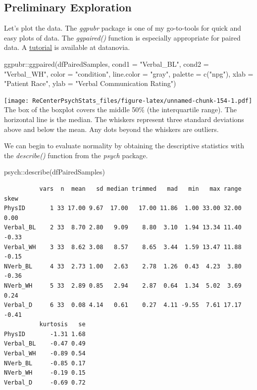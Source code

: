 \documentclass[
  11pt,
]{book}
\newenvironment{Shaded}{\begin{snugshade}}{\end{snugshade}}
\newcommand{\AttributeTok}[1]{\textcolor[rgb]{0.77,0.63,0.00}{#1}}
\newcommand{\FunctionTok}[1]{\textcolor[rgb]{0.00,0.00,0.00}{#1}}
\newcommand{\NormalTok}[1]{#1}
\newcommand{\SpecialCharTok}[1]{\textcolor[rgb]{0.00,0.00,0.00}{#1}}
\newcommand{\StringTok}[1]{\textcolor[rgb]{0.31,0.60,0.02}{#1}}
\begin{document}
\hypertarget{preliminary-exploration-2}{%
\subsection{Preliminary Exploration}\label{preliminary-exploration-2}}

Let's plot the data. The \emph{ggpubr} package is one of my go-to-tools for quick and easy plots of data. The \emph{ggpaired()} function is especially appropriate for paired data. A \href{https://rpkgs.datanovia.com/ggpubr/reference/ggpaired.html}{tutorial} is available at datanovia.

\begin{Shaded}
\begin{Highlighting}[]
\NormalTok{ggpubr}\SpecialCharTok{::}\FunctionTok{ggpaired}\NormalTok{(dfPairedSamples, }\AttributeTok{cond1 =} \StringTok{"Verbal\_BL"}\NormalTok{, }\AttributeTok{cond2 =} \StringTok{"Verbal\_WH"}\NormalTok{,}
    \AttributeTok{color =} \StringTok{"condition"}\NormalTok{, }\AttributeTok{line.color =} \StringTok{"gray"}\NormalTok{, }\AttributeTok{palette =} \FunctionTok{c}\NormalTok{(}\StringTok{"npg"}\NormalTok{), }\AttributeTok{xlab =} \StringTok{"Patient Race"}\NormalTok{,}
    \AttributeTok{ylab =} \StringTok{"Verbal Communication Rating"}\NormalTok{)}
\end{Highlighting}
\end{Shaded}

\texttt{[image: ReCenterPsychStats\_files/figure-latex/unnamed-chunk-154-1.pdf]}
The box of the boxplot covers the middle 50\% (the interquartile range). The horizontal line is the median. The whiskers represent three standard deviations above and below the mean. Any dots beyond the whiskers are outliers.

We can begin to evaluate normality by obtaining the descriptive statistics with the \emph{describe()} function from the \emph{psych} package.

\begin{Shaded}
\begin{Highlighting}[]
\NormalTok{psych}\SpecialCharTok{::}\FunctionTok{describe}\NormalTok{(dfPairedSamples)}
\end{Highlighting}
\end{Shaded}

\begin{verbatim}
          vars  n  mean   sd median trimmed   mad   min   max range  skew
PhysID       1 33 17.00 9.67  17.00   17.00 11.86  1.00 33.00 32.00  0.00
Verbal_BL    2 33  8.70 2.80   9.09    8.80  3.10  1.94 13.34 11.40 -0.33
Verbal_WH    3 33  8.62 3.08   8.57    8.65  3.44  1.59 13.47 11.88 -0.15
NVerb_BL     4 33  2.73 1.00   2.63    2.78  1.26  0.43  4.23  3.80 -0.36
NVerb_WH     5 33  2.89 0.85   2.94    2.87  0.64  1.34  5.02  3.69  0.24
Verbal_D     6 33  0.08 4.14   0.61    0.27  4.11 -9.55  7.61 17.17 -0.41
          kurtosis   se
PhysID       -1.31 1.68
Verbal_BL    -0.47 0.49
Verbal_WH    -0.89 0.54
NVerb_BL     -0.85 0.17
NVerb_WH     -0.19 0.15
Verbal_D     -0.69 0.72
\end{verbatim}
\end{document}
